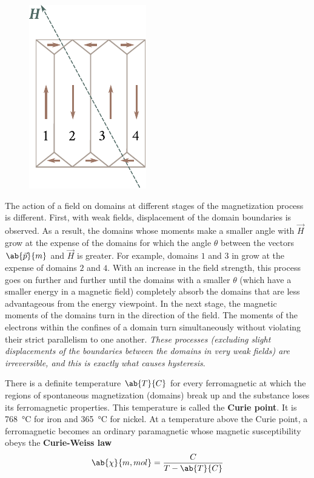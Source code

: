 \begin{figure}[!htb]
	\begin{center}
		\includegraphics[scale=1]{figures/ch_07/fig_7_20.pdf}
		\caption[]{}
		\label{fig:7_20}
	\end{center}
	\vspace{-0.8cm}
\end{figure}

The action of a field on domains at different stages of the magnetization process is different.
First, with weak fields, displacement of the domain boundaries is observed.
As a result, the domains whose moments make a smaller angle with $\vec{H}$ grow at the expense of the domains for which the angle $\theta$ between the vectors $\ab{\vec{p}}{m}$ and $\vec{H}$ is greater.
For example, domains $1$ and $3$ in  grow at the expense of domains $2$ and $4$.
With an increase in the field strength, this process goes on further and further until the domains with a smaller $\theta$ (which have a smaller energy in a magnetic field) completely absorb the domains that are less advantageous from the energy viewpoint.
In the next stage, the magnetic moments of the domains turn in the direction of the field.
The moments of the electrons within the confines of a domain turn simultaneously without violating their
strict parallelism to one another.
\textit{These processes (excluding slight displacements of the boundaries between the domains in very weak fields) are irreversible, and this is exactly what causes hysteresis}.

There is a definite temperature $\ab{T}{C}$ for every ferromagnetic at which the regions of spontaneous magnetization (domains) break up and the substance loses its ferromagnetic properties.
This temperature is called the \textbf{Curie point}. It is \SI{768}{\degreeCelsius} for iron and \SI{365}{\degreeCelsius} for nickel.
At a temperature above the Curie point, a ferromagnetic becomes an ordinary paramagnetic whose magnetic susceptibility obeys the \textbf{Curie-Weiss law}
\begin{equation}\label{eq:7_60}
    \ab{\chi}{m,mol} = \frac{C}{T - \ab{T}{C}}
\end{equation}

